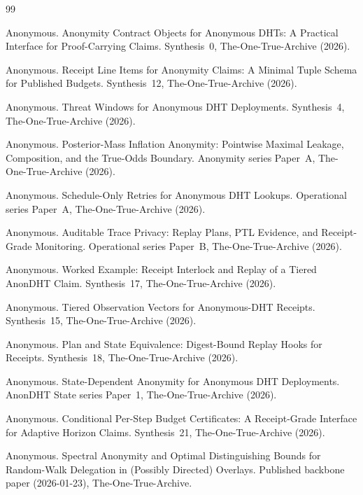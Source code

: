 \documentclass[11pt]{article}
\begin{document}
\begin{thebibliography}{99}\small

Anonymous.
\newblock Anonymity Contract Objects for Anonymous DHTs: A Practical Interface for Proof-Carrying Claims.
\newblock Synthesis~0, The-One-True-Archive (2026).

Anonymous.
\newblock Receipt Line Items for Anonymity Claims: A Minimal Tuple Schema for Published Budgets.
\newblock Synthesis~12, The-One-True-Archive (2026).

Anonymous.
\newblock Threat Windows for Anonymous DHT Deployments.
\newblock Synthesis~4, The-One-True-Archive (2026).

Anonymous.
\newblock Posterior-Mass Inflation Anonymity: Pointwise Maximal Leakage, Composition, and the True-Odds Boundary.
\newblock Anonymity series Paper~A, The-One-True-Archive (2026).

Anonymous.
\newblock Schedule-Only Retries for Anonymous DHT Lookups.
\newblock Operational series Paper~A, The-One-True-Archive (2026).

Anonymous.
\newblock Auditable Trace Privacy: Replay Plans, PTL Evidence, and Receipt-Grade Monitoring.
\newblock Operational series Paper~B, The-One-True-Archive (2026).

Anonymous.
\newblock Worked Example: Receipt Interlock and Replay of a Tiered AnonDHT Claim.
\newblock Synthesis~17, The-One-True-Archive (2026).

Anonymous.
\newblock Tiered Observation Vectors for Anonymous-DHT Receipts.
\newblock Synthesis~15, The-One-True-Archive (2026).

Anonymous.
\newblock Plan and State Equivalence: Digest-Bound Replay Hooks for Receipts.
\newblock Synthesis~18, The-One-True-Archive (2026).

Anonymous.
\newblock State-Dependent Anonymity for Anonymous DHT Deployments.
\newblock AnonDHT State series Paper~1, The-One-True-Archive (2026).

Anonymous.
\newblock Conditional Per-Step Budget Certificates: A Receipt-Grade Interface for Adaptive Horizon Claims.
\newblock Synthesis~21, The-One-True-Archive (2026).

Anonymous.
\newblock Spectral Anonymity and Optimal Distinguishing Bounds for Random-Walk Delegation in (Possibly Directed) Overlays.
\newblock Published backbone paper (2026-01-23), The-One-True-Archive.


\end{thebibliography}
\end{document}
